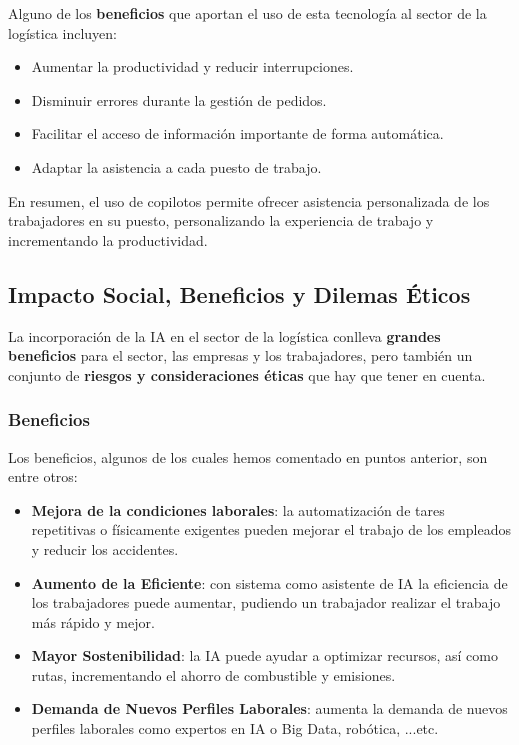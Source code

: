 Alguno de los \textbf{beneficios} que aportan el uso de esta tecnología al sector de la logística incluyen:

\begin{itemize}
	\item Aumentar la productividad y reducir interrupciones.
	\item Disminuir errores durante la gestión de pedidos.
	\item Facilitar el acceso de información importante de forma automática.
	\item Adaptar la asistencia a cada puesto de trabajo.
\end{itemize}

En resumen, el uso de copilotos permite ofrecer asistencia personalizada de los trabajadores en su puesto, personalizando la experiencia de trabajo y incrementando la productividad.

\subsection{Impacto Social, Beneficios y Dilemas Éticos}
La incorporación de la IA en el sector de la logística conlleva \textbf{grandes beneficios} para el sector, las empresas y los trabajadores, pero también un conjunto de \textbf{riesgos y consideraciones éticas} que hay que tener en cuenta.

\subsubsection{Beneficios}
Los beneficios, algunos de los cuales hemos comentado en puntos anterior, son entre otros:

\begin{itemize}
	\item \textbf{Mejora de la condiciones laborales}: la automatización de tares repetitivas o físicamente exigentes pueden mejorar el trabajo de los empleados y reducir los accidentes.
	\item \textbf{Aumento de la Eficiente}: con sistema como asistente de IA la eficiencia de los trabajadores puede aumentar, pudiendo un trabajador realizar el trabajo más rápido y mejor.
	\item \textbf{Mayor Sostenibilidad}: la IA puede ayudar a optimizar recursos, así como rutas, incrementando el ahorro de combustible y emisiones.
	\item \textbf{Demanda de Nuevos Perfiles Laborales}: aumenta la demanda de nuevos perfiles laborales como expertos en IA o Big Data, robótica, ...etc.
\end{itemize}

